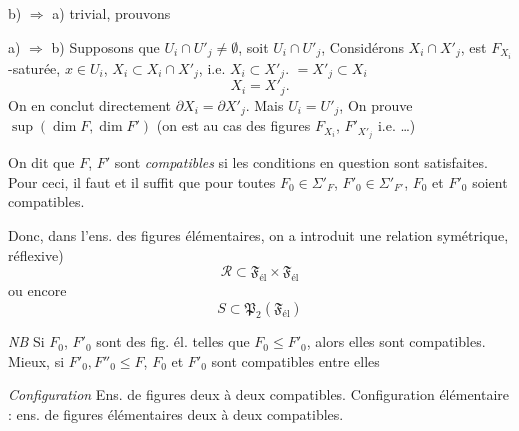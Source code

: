 \documentclass[11pt,a4paper]{article}
\begin{document}

\struck{\ill{}} b) $\Longrightarrow$ a) trivial, prouvons

a) $\Longrightarrow$ b)  Supposons que  $U_i \cap U'_j \neq \emptyset$,   soit  $U_i \cap U'_j$, Considérons $X_i \cap X'_j$, est  $F_{X_i}$-saturée, \struck{\ill{}}   \ill{} $x \in U_i$, \ill{} $X_i \subset X_i \cap X'_j$,  i.e. $X_i \subset X'_j$. \ill{} $= X'_j \subset X_i$
\[
  X_i = X'_j .
\]
 On en conclut \ill{} directement \struck{\ill{}} $\partial X_i = \partial X'_j$. Mais  $U_i = U'_j$,   On  prouve  $\sup(\dim F, \dim F')$ (on est \struck{\ill{}}   au cas des figures $F_{X_i}$, $F'_{X'_j}$  i.e. \ldots)

On dit que $F$, $F'$ sont \emph{compatibles} si les conditions en question sont satisfaites. Pour ceci, il faut et il suffit que pour toutes $F_0 \in \Sigma'_F$, $F'_0 \in \Sigma'_{F'}$, $F_0$ et $F'_0$ soient compatibles.

Donc, dans l'ens.  des figures élémentaires, on a introduit une relation symétrique, réflexive)
\[
  \mathcal{R} \subset \mathfrak{F}_{\mathrm{él}} \times \mathfrak{F}_{\mathrm{él}}
\]
ou encore
\[
  S \subset \mathfrak{P}_2(\mathfrak{F}_{\mathrm{él}})
\]

\emph{NB} Si \struck{\ill{}} $F_0$, $F'_0$ sont des fig. él. telles que $F_0 \leq F'_0$, alors elles sont compatibles. Mieux, si $F'_0, F''_0 \leq F$,  $F_0$ et $F'_0$ sont compatibles entre elles

\emph{Configuration} Ens. de figures deux à deux compatibles. Configuration élémentaire : ens. de figures élémentaires deux à deux compatibles.
\end{document}
